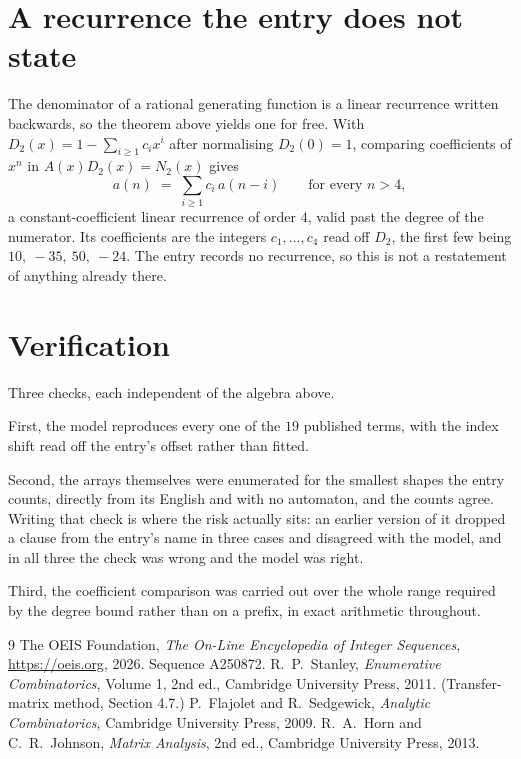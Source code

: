 \documentclass[11pt,a4paper]{article}
\theoremstyle{plain}
\theoremstyle{definition}
\begin{document}
\section{A recurrence the entry does not state}

The denominator of a rational generating function is a linear recurrence written backwards, so
the theorem above yields one for free. With $D_2(x)=1-\sum_{i\ge1}c_ix^i$ after normalising
$D_2(0)=1$, comparing coefficients of $x^n$ in $A(x)D_2(x)=N_2(x)$ gives
\[
a(n)\;=\;\sum_{i\ge1}c_i\,a(n-i)\qquad\text{for every }n>4,
\]
a constant-coefficient linear recurrence of order $4$, valid past the degree of the
numerator. Its coefficients are the integers $c_1,\dots,c_{4}$ read off $D_2$, the first few being $10,\ -35,\ 50,\ -24$. The entry records no recurrence, so this is not a restatement of anything
already there.

\section{Verification}

Three checks, each independent of the algebra above.

First, the model reproduces every one of the $19$ published terms, with the index shift
read off the entry's offset rather than fitted.

Second, the arrays themselves were enumerated for the smallest shapes the entry counts,
directly from its English and with no automaton, and the counts agree. Writing that check is
where the risk actually sits: an earlier version of it dropped a clause from the entry's name
in three cases and disagreed with the model, and in all three the check was wrong and the model
was right.

Third, the coefficient comparison was carried out over the whole range required by the degree
bound rather than on a prefix, in exact arithmetic throughout.

\begin{thebibliography}{9}
 The OEIS Foundation, \emph{The On-Line Encyclopedia of Integer
Sequences}, \url{https://oeis.org}, 2026. Sequence A250872.
 R.~P.~Stanley, \emph{Enumerative Combinatorics}, Volume 1, 2nd ed.,
Cambridge University Press, 2011. (Transfer-matrix method, Section 4.7.)
 P.~Flajolet and R.~Sedgewick, \emph{Analytic Combinatorics}, Cambridge
University Press, 2009.
 R.~A.~Horn and C.~R.~Johnson, \emph{Matrix Analysis}, 2nd ed., Cambridge
University Press, 2013.
\end{thebibliography}
\end{document}
